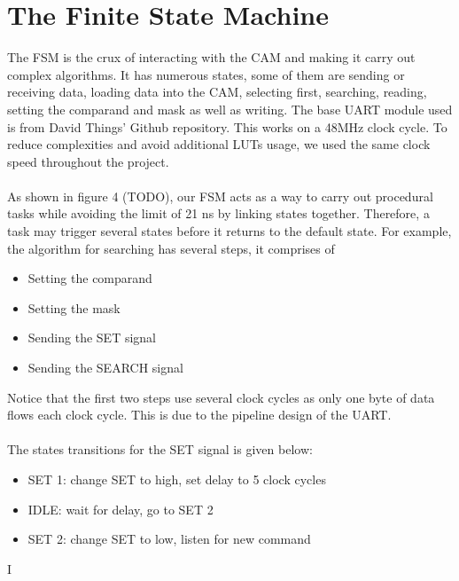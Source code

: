 \section{The Finite State Machine}
The FSM is the crux of interacting with the CAM and making it carry out complex algorithms. 
It has numerous states, some of them are sending or receiving data, loading data into the CAM, selecting first, searching, reading, setting the comparand and mask as well as writing. 
The base UART module used is from David Things' Github repository. \cite{uart} This works on a 48MHz clock cycle.
To reduce complexities and avoid additional LUTs usage, we used the same clock speed throughout the project. 
\\\\
As shown in figure 4 (TODO), our FSM acts as a way to carry out procedural tasks while avoiding the limit of 21 ns by linking states together. 
Therefore, a task may trigger several states before it returns to the default state. 
For example, the algorithm for searching has several steps, it comprises of
\begin{itemize}
    \item Setting the comparand 
    \item Setting the mask 
    \item Sending the SET signal 
    \item Sending the SEARCH signal 
\end{itemize}
Notice that the first two steps use several clock cycles as only one byte of data flows each clock cycle. 
This is due to the pipeline design of the UART. 
\\\\
The states transitions for the SET signal is given below:
\begin{itemize}
    \item  SET 1: change SET to high, set delay to 5 clock cycles
    \item  IDLE: wait for delay, go to SET 2
    \item  SET 2: change SET to low, listen for new command
\end{itemize}
I